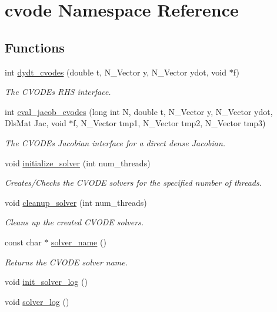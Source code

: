 \hypertarget{namespacecvode}{}\section{cvode Namespace Reference}
\label{namespacecvode}
\subsection*{Functions}
\begin{DoxyCompactItemize}
\item 
int \hyperlink{namespacecvode_aa10a063b2a82d5b49c2bb338f16ddae4}{dydt\+\_\+cvodes} (double t, N\+\_\+\+Vector y, N\+\_\+\+Vector ydot, void $\ast$f)
\begin{DoxyCompactList}\small\item\em The C\+V\+O\+D\+Es R\+HS interface. \end{DoxyCompactList}\item 
int \hyperlink{namespacecvode_ab2efc395730d25bedc496a62e7896d24}{eval\+\_\+jacob\+\_\+cvodes} (long int N, double t, N\+\_\+\+Vector y, N\+\_\+\+Vector ydot, Dls\+Mat Jac, void $\ast$f, N\+\_\+\+Vector tmp1, N\+\_\+\+Vector tmp2, N\+\_\+\+Vector tmp3)
\begin{DoxyCompactList}\small\item\em The C\+V\+O\+D\+Es Jacobian interface for a direct dense Jacobian. \end{DoxyCompactList}\item 
void \hyperlink{namespacecvode_abe146525cea80d8032cd30b4441b5872}{initialize\+\_\+solver} (int num\+\_\+threads)
\begin{DoxyCompactList}\small\item\em Creates/\+Checks the C\+V\+O\+DE solvers for the specified number of threads. \end{DoxyCompactList}\item 
void \hyperlink{namespacecvode_ac9bc4957bff6721dae9d7e4cc470d184}{cleanup\+\_\+solver} (int num\+\_\+threads)
\begin{DoxyCompactList}\small\item\em Cleans up the created C\+V\+O\+DE solvers. \end{DoxyCompactList}\item 
const char $\ast$ \hyperlink{namespacecvode_a3a26024b8dc2ce6f8b2afcfb7c82c79f}{solver\+\_\+name} ()
\begin{DoxyCompactList}\small\item\em Returns the C\+V\+O\+DE solver name. \end{DoxyCompactList}\item 
void \hyperlink{namespacecvode_a9113d5fb0e19fa927d73b64c397ecd09}{init\+\_\+solver\+\_\+log} ()
\item 
void \hyperlink{namespacecvode_af7eb796b6829fecab506fb6dfec39be0}{solver\+\_\+log} ()
\end{DoxyCompactItemize}
